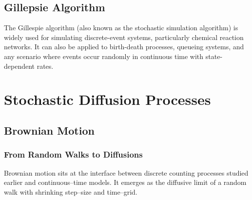 \documentclass[10pt, headings=standardclasses, parskip=half, twoside]{scrartcl}
\renewcommand{\emph}[1]{\textcolor{mypurple}{#1}}
\newcommand{\vect}[1]{\vec{\boldsymbol{#1}}}
\begin{document}
\subsection{Gillepsie Algorithm}\label{subsec:gillespie}

The Gillespie algorithm (also known as the \emph{stochastic simulation algorithm}) is widely used for simulating discrete-event systems, particularly chemical reaction networks. 
It can also be applied to birth-death processes, queueing systems, and any scenario where events occur randomly in continuous time with state-dependent rates.



\section{Stochastic Diffusion Processes}\label{sec:diffusion}


\subsection{Brownian Motion}\label{subsec:brownian}


\subsubsection{From Random Walks to Diffusions}
Brownian motion sits at the interface between 
\emph{discrete} counting processes studied earlier and \emph{continuous}–time models.  
It emerges as the diffusive limit of a random walk with shrinking step--size and time–grid.
\end{document}
